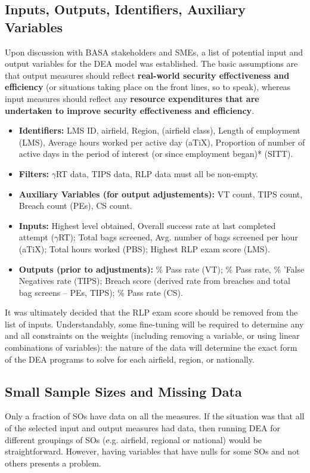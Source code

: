 \subsection{Inputs, Outputs, Identifiers, Auxiliary Variables}
Upon discussion with BASA stakeholders and SMEs, a list of potential input and output variables for the DEA model was established. 
\newl The basic assumptions are that output measures should reflect \textbf{real-world security effectiveness and efficiency} (or situations taking place on the front lines, so to speak), whereas input measures should reflect any \textbf{resource expenditures that are undertaken to improve security effectiveness and efficiency}. 
\begin{itemize}[noitemsep]
\item\textbf{Identifiers:} LMS ID, airfield, Region, (airfield class), Length of employment (LMS), Average hours worked per active day (aTiX), Proportion of number of active days in the period of interest (or since employment began)* (SITT). 
\item\textbf{Filters:} $\gamma$RT data, TIPS data, RLP data must all be non-empty.
\item\textbf{Auxiliary Variables (for output adjustements):} VT count, TIPS count, Breach count (PEs), CS count.
\item\textbf{Inputs:} Highest level obtained, Overall success rate at last completed attempt ($\gamma$RT);
Total bags screened, Avg. number of bags screened per hour (aTiX); Total hours worked (PBS); Highest RLP exam score (LMS).
\item\textbf{Outputs (prior to adjustments):} \% Pass rate (VT); \% Pass rate, \% 'False Negatives rate (TIPS); Breach score (derived rate from breaches and total bag screens -- PEs, TIPS); \% Pass rate (CS).
\end{itemize}
It was ultimately decided that the RLP exam score should be removed from the list of inputs. Understandably, some fine-tuning will be required to determine any and all constraints on the weights (including removing a variable, or using linear combinations of variables): the nature of the data will determine the exact form of the DEA programs to solve for each airfield, region, or nationally.   
\subsection{Small Sample Sizes and Missing Data}
Only a fraction of SOs have data on all the measures. If the situation was that all of the selected input and output measures had data, then running DEA for different groupings of SOs (e.g. airfield, regional or national) would be straightforward.  However, having variables that have nulls for some SOs and not others presents a problem.  


